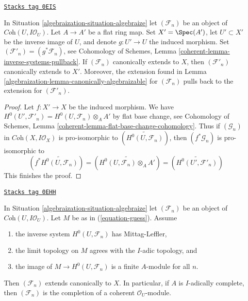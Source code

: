 \begin{lemma}
\label{algebraization-lemma-canonically-extend-base-change}
\href{https://stacks.math.columbia.edu/tag/0EIS}{\texttt{Stacks tag 0EIS}}

In Situation \ref{algebraization-situation-algebraize} let $(\mathcal{F}_n)$ be an
object of $\textit{Coh}(U, I\mathcal{O}_U)$. Let $A \to A'$ be a flat ring
map. Set $X' = \Spec(A')$, let $U' \subset X'$ be the inverse image of $U$,
and denote $g : U' \to U$ the induced morphism. Set
$(\mathcal{F}'_n) = (g^*\mathcal{F}_n)$, see
Cohomology of Schemes, Lemma \ref{coherent-lemma-inverse-systems-pullback}.
If $(\mathcal{F}_n)$ canonically extends to $X$, then
$(\mathcal{F}'_n)$ canonically extends to $X'$.
Moreover, the extension found in Lemma \ref{algebraization-lemma-canonically-algebraizable}
for $(\mathcal{F}_n)$ pulls back to the extension for
$(\mathcal{F}'_n)$.
\end{lemma}

\begin{proof}
Let $f : X' \to X$ be the induced morphism.
We have $H^0(U', \mathcal{F}'_n) = H^0(U, \mathcal{F}_n) \otimes_A A'$ by
flat base change, see Cohomology of Schemes, Lemma
\ref{coherent-lemma-flat-base-change-cohomology}.
Thus if $(\mathcal{G}_n)$ in $\textit{Coh}(X, I\mathcal{O}_X)$
is pro-isomorphic to $(\widetilde{H^0(U, \mathcal{F}_n)})$, then
$(f^*\mathcal{G}_n)$ is pro-isomorphic to
$$
(f^*\widetilde{H^0(U, \mathcal{F}_n)}) =
(\widetilde{H^0(U, \mathcal{F}_n) \otimes_A A'}) =
(\widetilde{H^0(U', \mathcal{F}'_n)})
$$
This finishes the proof.
\end{proof}

\begin{lemma}
\label{algebraization-lemma-when-done}
\href{https://stacks.math.columbia.edu/tag/0EHH}{\texttt{Stacks tag 0EHH}}

In Situation \ref{algebraization-situation-algebraize} let $(\mathcal{F}_n)$ be an object
of $\textit{Coh}(U, I\mathcal{O}_U)$. Let $M$ be as in (\ref{equation-guess}).
Assume
\begin{enumerate}
\item[(a)] the inverse system $H^0(U, \mathcal{F}_n)$ has Mittag-Leffler,
\item[(b)] the limit topology on $M$ agrees with the $I$-adic topology, and
\item[(c)] the image of $M \to H^0(U, \mathcal{F}_n)$ is a finite $A$-module
for all $n$.
\end{enumerate}
Then $(\mathcal{F}_n)$ extends canonically to $X$.
In particular, if $A$ is $I$-adically complete, then
$(\mathcal{F}_n)$ is the completion of a coherent $\mathcal{O}_U$-module.
\end{lemma}

